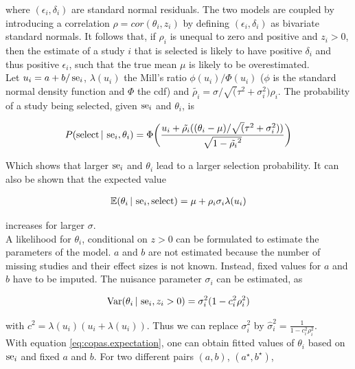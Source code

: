 \documentclass[11pt,a4paper,twoside]{book}\usepackage[]{graphicx}\usepackage[]{color}
\begin{document}
where $(\epsilon_i, \delta_i)$ are standard normal residuals. The two models are coupled by introducing a correlation $\rho = cor(\theta_i, z_i)$ by defining $(\epsilon_i, \delta_i)$ as bivariate standard normals. It follows that,
if $\rho_i$ is unequal to zero and positive and $z_i > 0$, then the estimate of a study $i$ that is selected is likely to have positive $\delta_i$ and thus positive $\epsilon_i$, such that the true mean $\mu$ is likely to be overestimated. \\
Let $u_i = a + b/\operatorname{se}_i$, $\lambda(u_i)$ the Mill's ratio $\phi(u_i)/\Phi(u_i)$ ($\phi$ is the standard normal density function and $\Phi$ the cdf) and $\tilde{\rho_i} = \sigma/\sqrt(\tau^2 + \sigma_i^2) \rho_i$. The probability of a study being selected, given $\operatorname{se}_i$ and $\theta_i$, is

\begin{align}
P(\textrm{select} \given \se_i, \theta_i) = %
\Phi\bigg(\frac{u_i + \tilde{\rho_i}((\theta_i - \mu)/\sqrt(\tau^2 + \sigma_i^2))}{\sqrt{1 - \tilde{\rho_i}^2}}\bigg) \nonumber
\end{align}

Which shows that larger $\operatorname{se}_i$ and $\theta_i$ lead to a larger selection probability. It can also be shown that the expected value 

\begin{align}
\mathbb{E}(\theta_i \,\vert\, \operatorname{se}_i, \textrm{select}) = \mu + \rho_i\sigma_i\lambda(u_i) \label{eq:copas.expectation}
\end{align}

increases for larger $\sigma$.\\
A likelihood for $\theta_i$, conditional on $z>0$ can be formulated to estimate the parameters of the model. $a$ and $b$ are not estimated because the number of missing studies and their effect sizes is not known. Instead, fixed values for $a$ and $b$ have to be imputed.
The nuisance parameter $\sigma_i$ can be estimated, as

\begin{align}
\textrm{Var}(\theta_i\,\vert\, \operatorname{se}_i, z_i > 0) = \sigma_i^2 (1 - c_i^2\rho_i^2) \nonumber
\end{align}

with $c^2 = \lambda(u_i)(u_i + \lambda(u_i))$. Thus we can replace $\sigma_i^2$ by $\hat{\sigma}_i^2 = \frac{1}{1-c_i^2\rho_i^2}$. \\ 
With equation \eqref{eq:copas.expectation}, one can obtain fitted values of $\theta_i$ based on $\operatorname{se}_i$ and fixed $a$ and $b$. For two different pairs $(a,b)$, $(a^\star, b^\star)$,
\end{document}
